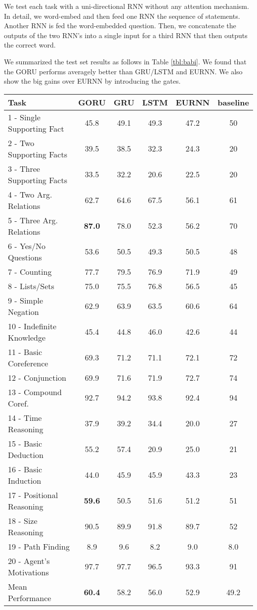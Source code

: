 \documentclass[letterpaper]{article} \usepackage{aaai18}  \usepackage{times}  \usepackage{helvet}  \usepackage{courier}  \usepackage{url}  \usepackage{graphicx}
\begin{document}
We test each task with a uni-directional RNN without any attention mechanism. In detail, we word-embed and then feed one RNN the sequence of statements. Another RNN is fed the word-embedded question. Then, we concatenate the outputs of the two RNN's into a single input for a third RNN that then outputs the correct word. 

We summarized the test set results as follows in Table \ref{tbl:babi}. We found that the GORU performs averagely better than GRU/LSTM and EURNN. We also show the big gains over EURNN by introducing the gates.

\begin{table*}[!htb]
\centering
\begin{tabular}{lccccc}
\hline
Task           & GORU & GRU & LSTM & EURNN &  baseline \cite{weston2015towards}\\
\hline
1 - Single Supporting Fact	&	45.8	&	49.1	&	49.3	&	47.2	&	50	\\
2 - Two Supporting Facts	& 	39.5	&	38.5	&	32.3	&	24.3	&	20	\\
3 - Three Supporting Facts	&	33.5	&	32.2	&	20.6	&	22.5	&	20	\\
4 - Two Arg. Relations	&	62.7	&	64.6	&	67.5	&	56.1		&	61	\\
5 - Three Arg. Relations	&	\textbf{87.0}	&	78.0	&	52.3	&	56.2	&	70	\\
6 - Yes/No Questions	&	53.6	&	50.5	&	49.3	&	50.5	&	48	\\
7 - Counting	&	77.7		&	79.5	&	76.9	&	71.9	&	49	\\
8 - Lists/Sets	&	75.0	&	75.5	&	76.8	&	56.5	&	45	\\
9 - Simple Negation	&	62.9	&	63.9	&	63.5	&	60.6	&	64	\\
10 - Indefinite Knowledge	&	45.4	&	44.8	&	46.0	&	42.6	&	44	\\
11 - Basic Coreference	&	69.3	&	71.2	&	71.1	&	72.1	&	72	\\
12 - Conjunction	&	69.9	&	71.6	&	71.9	&	72.7	&	74	\\
13 - Compound Coref.	&	92.7	&	94.2	&	93.8	&	92.4	&	94	\\
14 - Time Reasoning	&	37.9	&	39.2	&	34.4	&	20.0	&	27	\\
15 - Basic Deduction	&	55.2	&	57.4	&	20.9	&	25.0	&	21	\\
16 - Basic Induction	&	44.0	&	45.9	&	45.9	&	43.3	&	23	\\
17 - Positional Reasoning	&	\textbf{59.6}	&	50.5	&	51.6	&	51.2	&	51	\\
18 - Size Reasoning	&	90.5	&	89.9	&	91.8	&	89.7		&	52	\\
19 - Path Finding	&	8.9		&	9.6		&	8.2		&	9.0	&	8.0	\\
20 - Agent's Motivations	&	97.7	&	97.7	&	96.5	&	93.3	&	91		\\
\hline
Mean Performance	&	\textbf{60.4}	&	58.2	&	56.0	&	52.9	&	49.2		\\
\hline
\end{tabular}
\caption{Question Answering task on bAbI dataset. Test accuracy (\%) on GORU, GRU, LSTM and EURNN. All models are performed on one-way RNN without extra memory or attention mechanism. GORU achieves highest average accuracy.}
\label{tbl:babi}
\end{table*}
\end{document}
